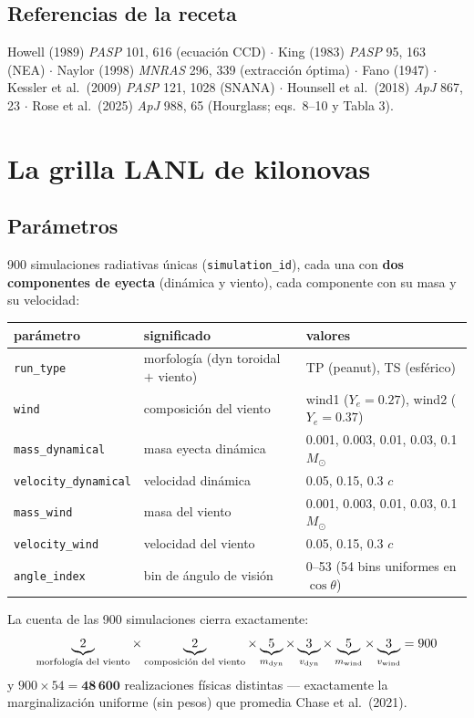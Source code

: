 \documentclass[11pt,a4paper]{article}
\newcommand{\code}[1]{\texttt{\small #1}}
\newcommand{\Msun}{M_\odot}
\begin{document}
\subsection{Referencias de la receta}
Howell (1989) \emph{PASP} 101, 616 (ecuación CCD) $\cdot$ King (1983) \emph{PASP} 95, 163 (NEA)
$\cdot$ Naylor (1998) \emph{MNRAS} 296, 339 (extracción óptima) $\cdot$ Fano (1947) $\cdot$
Kessler et al.\ (2009) \emph{PASP} 121, 1028 (SNANA) $\cdot$ Hounsell et al.\ (2018) \emph{ApJ} 867,
23 $\cdot$ Rose et al.\ (2025) \emph{ApJ} 988, 65 (Hourglass; eqs.\ 8--10 y Tabla 3).

\section{La grilla LANL de kilonovas}

\subsection{Parámetros}
900 simulaciones radiativas únicas (\code{simulation\_id}), cada una con \textbf{dos componentes de
eyecta} (dinámica y viento), cada componente con su masa y su velocidad:

\begin{center}
\begin{tabular}{lll}
\toprule
parámetro & significado & valores \\
\midrule
\code{run\_type} & morfología (dyn toroidal $+$ viento) & TP (peanut), TS (esférico) \\
\code{wind} & composición del viento & wind1 ($Y_e{=}0.27$), wind2 ($Y_e{=}0.37$) \\
\code{mass\_dynamical} & masa eyecta dinámica & 0.001, 0.003, 0.01, 0.03, 0.1 $\Msun$ \\
\code{velocity\_dynamical} & velocidad dinámica & 0.05, 0.15, 0.3 $c$ \\
\code{mass\_wind} & masa del viento & 0.001, 0.003, 0.01, 0.03, 0.1 $\Msun$ \\
\code{velocity\_wind} & velocidad del viento & 0.05, 0.15, 0.3 $c$ \\
\code{angle\_index} & bin de ángulo de visión & 0--53 (54 bins uniformes en $\cos\theta$) \\
\bottomrule
\end{tabular}
\end{center}

La cuenta de las 900 simulaciones cierra exactamente:
\begin{equation}
\underbrace{2}_{\text{morfología del viento}} \times
\underbrace{2}_{\text{composición del viento}} \times
\underbrace{5}_{m_{\rm dyn}} \times \underbrace{3}_{v_{\rm dyn}} \times
\underbrace{5}_{m_{\rm wind}} \times \underbrace{3}_{v_{\rm wind}} = 900
\end{equation}
y $900 \times 54 = \mathbf{48\,600}$ realizaciones físicas distintas --- exactamente la
marginalización uniforme (sin pesos) que promedia Chase et al.\ (2021).
\end{document}
